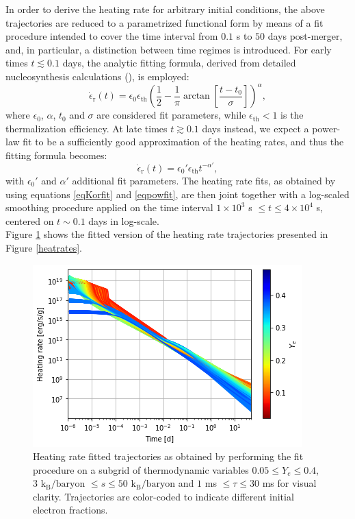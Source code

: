 \documentclass[fleqn,usenatbib]{mnras}
\begin{document}
    In order to derive the heating rate for arbitrary initial conditions, the above trajectories are reduced to a parametrized functional form by means of a fit procedure intended to cover the time interval from $0.1$ s to $50$ days post-merger, and, in particular, a distinction between time regimes is introduced. For early times $t\lesssim0.1$ days, the analytic fitting formula, derived from detailed nucleosynthesis calculations (\cite{Korobkin:2012uy}), is employed:
    \begin{equation}
    \label{eqKorfit}
    \dot{\epsilon}_{\mathrm{r}}(t)=\epsilon_0\epsilon_{\mathrm{th}}\left(\frac{1}{2}-\frac{1}{\pi}\arctan{\left[\frac{t-t_0}{\sigma}\right]}\right)^{\alpha},
    \end{equation}
    where $\epsilon_0$, $\alpha$, $t_0$ and $\sigma$ are considered fit parameters, while $\epsilon_{\mathrm{th}}<1$ is the thermalization efficiency. At late times $t\gtrsim0.1$ days instead, we expect a power-law fit to be a sufficiently good approximation of the heating rates, and thus the fitting formula becomes:
    \begin{equation}
    \label{eqpowfit}
    \dot{\epsilon}_{\mathrm{r}}(t)=\epsilon_0'\epsilon_{\mathrm{th}}t^{-\alpha'},
    \end{equation}
    with $\epsilon_0'$ and $\alpha'$ additional fit parameters. The heating rate fits, as obtained by using equations \ref{eqKorfit} and \ref{eqpowfit}, are then joint together with a log-scaled smoothing procedure applied on the time interval $1\times10^3$ s $\leq t\leq4\times10^4$ s, centered on $t\sim0.1$ days in log-scale.\\
    Figure \ref{heatratesfit} shows the fitted version of the heating rate trajectories presented in Figure \ref{heatrates}.
    \begin{figure}
    \centering
    \includegraphics[scale=0.65]{figures/heating/heating rate fits/heatratesfit.png}
    \caption{Heating rate fitted trajectories as obtained by performing the fit procedure on a subgrid of thermodynamic variables $0.05\leq Y_e\leq0.4$, $3$ $\mathrm{k_B/baryon}$ $\leq s\leq50$ $\mathrm{k_B/baryon}$ and $1$ ms $\leq\tau\leq30$ ms for visual clarity. Trajectories are color-coded to indicate different initial electron fractions.}
    \label{heatratesfit}
    \end{figure}
\end{document}
